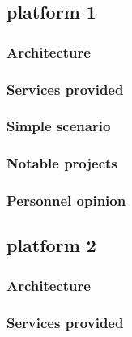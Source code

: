 \documentclass[a4paper,11pt]{report}
\begin{document}
  \subsection{platform 1} %
  
  \subsubsection{Architecture}
  
  \subsubsection{Services provided}
  
  \subsubsection{Simple scenario}
  
  \subsubsection{Notable projects}
  
  \subsubsection{Personnel opinion}
  
  \subsection{platform 2} %
  
  \subsubsection{Architecture}
  
  \subsubsection{Services provided}
  
\end{document}
